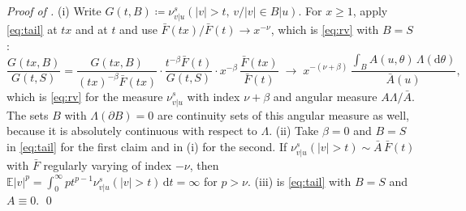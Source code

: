 \documentclass[11pt]{article}
\theoremstyle{plain}
\theoremstyle{definition}
\theoremstyle{remark}
\newcommand{\E}{\mathbb{E}}
\newcommand{\Dd}{\mathrm{d}}
\newcommand{\define}{\coloneqq}
\newcommand{\abs}[1]{\left\lvert #1 \right\rvert}
\begin{document}
\smallskip
\noindent\emph{Proof of .}
(i) Write $G(t,B)\define\nu^{s}_{v\vert u}(\abs{v}>t,\,v/\abs{v}\in B\vert u)$.
For $x\ge1$, apply \eqref{eq:tail} at $tx$ and at $t$ and use
$\bar F(tx)/\bar F(t)\to x^{-\nu}$, which is \eqref{eq:rv} with $B=S$:
\begin{equation*}
 \frac{G(tx,B)}{G(t,S)}
 =\frac{G(tx,B)}{(tx)^{-\beta}\bar F(tx)}\cdot\frac{t^{-\beta}\bar F(t)}{G(t,S)}\cdot x^{-\beta}\,\frac{\bar F(tx)}{\bar F(t)}
 \;\longrightarrow\;x^{-(\nu+\beta)}\,\frac{\int_BA(u,\theta)\,\Lambda(\Dd\theta)}{\bar A(u)},
\end{equation*}
which is \eqref{eq:rv} for the measure $\nu^{s}_{v\vert u}$ with index
$\nu+\beta$ and angular measure $A\Lambda/\bar A$. The sets $B$ with
$\Lambda(\partial B)=0$ are continuity sets of this angular measure as well,
because it is absolutely continuous with respect to $\Lambda$. (ii) Take
$\beta=0$ and $B=S$ in \eqref{eq:tail} for the first claim and in (i) for the
second. If $\nu^{s}_{v\vert u}(\abs{v}>t)\sim\bar A\,\bar F(t)$ with $\bar F$
regularly varying of index $-\nu$, then
$\E\abs{v}^{p}=\int_0^\infty pt^{p-1}\nu^{s}_{v\vert u}(\abs{v}>t)\,\Dd t=\infty$
for $p>\nu$. (iii) is \eqref{eq:tail} with $B=S$ and $A\equiv0$.
\qed
\end{document}
